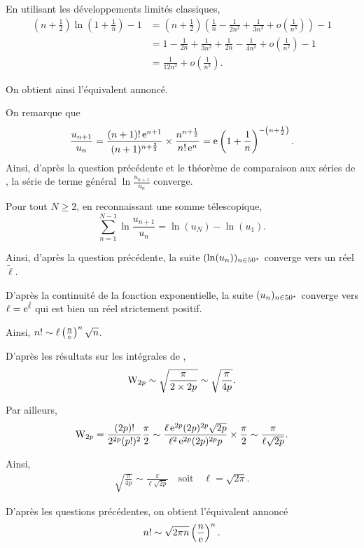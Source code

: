 \begin{solution}
\begin{reponses}
\item En utilisant les développements limités classiques,
\begin{align*}
\left(n + \frac{1}{2}\right) \ln\mathopen{}\left(1 + \frac{1}{n}\right) - 1
&= \left(n + \frac{1}{2}\right) \left(\frac{1}{n} - \frac{1}{2 n^2} + \frac{1}{3 n^3} + o\mathopen{}\left(\frac{1}{n^3}\right)\right) - 1\\
&= 1 - \frac{1}{2 n} + \frac{1}{3 n^2} + \frac{1}{2 n} - \frac{1}{4 n^2} + o\mathopen{}\left(\frac{1}{n^2}\right) - 1\\
&= \frac{1}{12 n^2} + o\mathopen{}\left(\frac{1}{n^2}\right).
\end{align*}

On obtient ainsi l'équivalent annoncé.

\item On remarque que
\[
\frac{u_{n+1}}{u_n}
= \frac{(n + 1)!\, \mathrm{e}^{n+1}}{(n+1)^{n+\frac{3}{2}}} \times \frac{n^{n+\frac{1}{2}}}{n!\, \mathrm{e}^n}
= \mathrm{e} \left(1 + \frac{1}{n}\right)^{-\mathopen{}\left(n + \frac{1}{2}\right)}.
\]
Ainsi, d'après la question précédente et le théorème de comparaison aux séries de , la série de terme général $\ln\frac{u_{n+1}}{u_n}$ converge.

\item Pour tout $N \geqslant 2$, en reconnaissant une somme télescopique,
\[
\sum_{n=1}^{N-1} \ln\frac{u_{n+1}}{u_n} = \ln(u_N) - \ln(u_1).
\]

Ainsi, d'après la question précédente, la suite $(\ln(u_n))_{n\in50^\star}$ converge vers un réel $\tilde{\ell}$.

D'après la continuité de la fonction exponentielle, la suite $(u_n)_{n\in50^\star}$ converge vers $\ell = \mathrm{e}^{\tilde{\ell}}$ qui est bien un réel strictement positif.

Ainsi, $n! \sim \ell \left(\frac{n}{\mathrm{e}}\right)^n \sqrt{n}$.

\item D'après les résultats sur les intégrales de ,
\[
\mathrm{W}_{2p}
\sim \sqrt{\frac{\pi}{2\times 2p}}
\sim \sqrt{\frac{\pi}{4 p}}.
\]

Par ailleurs,
\begin{align*}
\mathrm{W}_{2p}
= \frac{(2p)!}{2^{2p} (p!)^2} \frac{\pi}{2}
\sim \frac{\ell\, \mathrm{e}^{2p} (2p)^{2p} \sqrt{2p}}{\ell^2\, \mathrm{e}^{2p} (2p)^{2p} p} \times \frac{\pi}{2}
\sim \frac{\pi}{\ell \sqrt{2 p}}.
\end{align*}

Ainsi,
\begin{align*}
\sqrt{\frac{\pi}{4 p}} \sim \frac{\pi}{\ell \sqrt{2p}}
\quad \text{soit} \quad 
\ell = \sqrt{2 \pi}.
\end{align*}

\item D'après les questions précédentes, on obtient l'équivalent annoncé
\[
n! \sim \sqrt{2 \pi n} \left(\frac{n}{\mathrm{e}}\right)^n.
\]
\end{reponses}
\end{solution}

